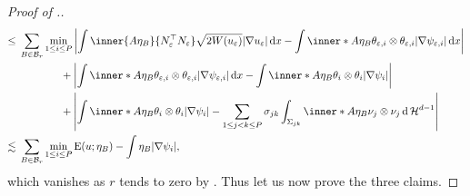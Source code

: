 \begin{proof}[Proof of .]
\begin{align*}
		\leq{} &
		\sum_{ B \in \mathcal{ B }_{ r } }
		\min_{ 1 \leq i \leq P }
		\abs{ 
			\int
			\inner{ A \eta_{ B } }{ N_{ \varepsilon }^{ \top } N_{ \varepsilon 
			} }
			\sqrt{ 2 W ( u_{ \varepsilon } ) }
			\abs{ \nabla u_{ \varepsilon } }
			\dd{ x }
			-
			\int
			\inner*{ A \eta_{ B } }
			{ \theta_{ \varepsilon , i }\otimes \theta_{ \varepsilon ,i } 
			}
			\abs{ \nabla \psi_{ \varepsilon,  i } }
			\dd{ x }
		}
		\\
		& \quad \quad \quad \;\;\;\!\: +
		\abs{ 
			\int
			\inner*{ A \eta_{ B } }{ \theta_{ \varepsilon ,i } \otimes 
				\theta_{ \varepsilon , i } }
			\abs{ \nabla \psi_{ \varepsilon, i } }
			\dd{ x }
			-
			\int
			\inner*{ A \eta_{ B } }
			{ \theta_{ i } \otimes \theta_{ i } }
			\abs{ \nabla \psi_{ i } }
		}
		\\
		& \quad \quad \quad \;\;\;\!\: +
		\abs{ 
			\int
			\inner*{ A \eta_{ B } }
			{ \theta_{ i } \otimes \theta_{ i } }
			\abs{ \nabla \psi_{ i } }
			-
			\sum_{ 1 \leq j < k \leq P }
			\sigma_{ j k }
			\int_{ \Sigma_{ j k } }
			\inner*{ A \eta_{ B } }
			{ \nu_{ j } \otimes \nu_{ j } }
			\dd{ \hm^{ d - 1 } }
		}
		\\
		\lesssim {} &
		\sum_{ B \in \mathcal{ B }_{ r } }
		\min_{ 1 \leq i \leq P }
		\energy ( u ; \eta_{ B } )
		-
		\int
		\eta_{ B }
		\abs{ \nabla \psi_{ i } },
	\end{align*}
	which vanishes as $ r $ tends to zero by 
	.
	Thus let us now prove the three claims.
	

\end{proof}
